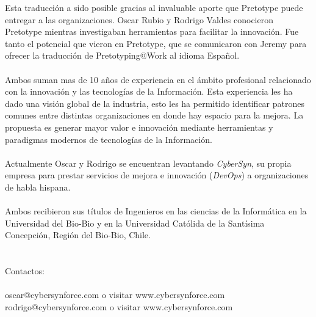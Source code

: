 \documentclass{article}
\begin{document}
Esta traducci\'on a sido posible gracias al invaluable aporte que Pretotype puede entregar a las organizaciones. Oscar Rubio y Rodrigo Valdes conocieron Pretotype mientras investigaban herramientas para facilitar la innovaci\'on. Fue tanto el potencial que vieron en Pretotype, que se comunicaron con Jeremy para ofrecer la traducci\'on de Pretotyping@Work al idioma Espa\~nol.
\\ \\
Ambos suman mas de 10 a\~nos de experiencia en el \'ambito profesional relacionado con la innovaci\'on y las tecnolog\'ias de la Informaci\'on. Esta experiencia les ha dado una visi\'on global de la industria, esto les ha permitido identificar patrones comunes entre distintas organizaciones en donde hay espacio para la mejora. La propuesta es generar mayor valor e innovaci\'on mediante herramientas y paradigmas modernos de tecnolog\'ias de la Informaci\'on.
\\ \\
Actualmente Oscar y Rodrigo se encuentran levantando \textit{CyberSyn}, su propia empresa para prestar servicios de mejora e innovaci\'on (\textit{DevOps}) a organizaciones de habla hispana.
\\ \\
Ambos recibieron sus t\'itulos de Ingenieros en las ciencias de la Inform\'atica en la Universidad del Bio-Bio y en la Universidad Cat\'olida de la Sant\'isima Concepci\'on, Regi\'on del Bio-Bio, Chile.
\\ \\ \\
Contactos:
\\ \\
oscar@cybersynforce.com o visitar www.cybersynforce.com
\\ 
rodrigo@cybersynforce.com o visitar www.cybersynforce.com
\end{document}
